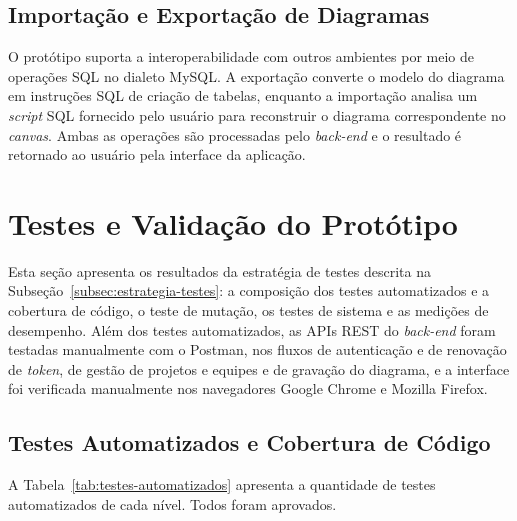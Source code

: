 \subsection{Importação e Exportação de Diagramas}

O protótipo suporta a interoperabilidade com outros ambientes por meio de operações SQL no dialeto MySQL. A exportação converte o modelo do diagrama em instruções SQL de criação de tabelas, enquanto a importação analisa um \textit{script} SQL fornecido pelo usuário para reconstruir o diagrama correspondente no \textit{canvas}. Ambas as operações são processadas pelo \textit{back-end} e o resultado é retornado ao usuário pela interface da aplicação.

\section{Testes e Validação do Protótipo}
\label{sec:testes-validacao}

Esta seção apresenta os resultados da estratégia de testes descrita na Subseção~\ref{subsec:estrategia-testes}: a composição dos testes automatizados e a cobertura de código, o teste de mutação, os testes de sistema e as medições de desempenho. Além dos testes automatizados, as APIs REST do \textit{back-end} foram testadas manualmente com o Postman, nos fluxos de autenticação e de renovação de \textit{token}, de gestão de projetos e equipes e de gravação do diagrama, e a interface foi verificada manualmente nos navegadores Google Chrome e Mozilla Firefox.

\subsection{Testes Automatizados e Cobertura de Código}

A Tabela~\ref{tab:testes-automatizados} apresenta a quantidade de testes automatizados de cada nível. Todos foram aprovados.

